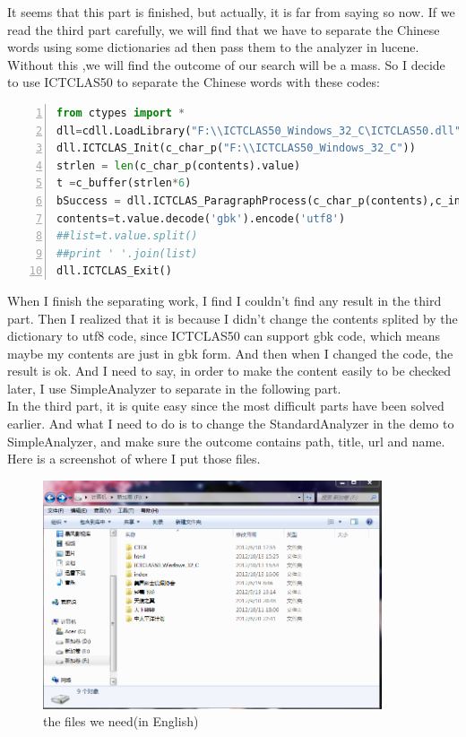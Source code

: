 \documentclass{article}
\begin{document}
It seems that this part is finished, but actually, it is far from saying so now. If we read the third part carefully, we will find that we have to separate the Chinese words using some dictionaries ad then pass them to the analyzer in lucene. Without this ,we will find the outcome of our search will be a mass. So I decide to use ICTCLAS50 to separate the Chinese words with these codes:\\
\begin{lstlisting}[language=python,numbers=left,frame=leftline]
from ctypes import *
dll=cdll.LoadLibrary("F:\\ICTCLAS50_Windows_32_C\ICTCLAS50.dll")
dll.ICTCLAS_Init(c_char_p("F:\\ICTCLAS50_Windows_32_C"))
strlen = len(c_char_p(contents).value)
t =c_buffer(strlen*6)
bSuccess = dll.ICTCLAS_ParagraphProcess(c_char_p(contents),c_int(strlen),t,c_int(0),0)
contents=t.value.decode('gbk').encode('utf8')
##list=t.value.split()
##print ' '.join(list)
dll.ICTCLAS_Exit()
\end{lstlisting}
When I finish the separating work, I find I couldn't find any result in the third part. Then I realized that it is because I didn't change the contents splited by the dictionary to utf8 code, since ICTCLAS50 can support gbk code, which means maybe my contents are just in gbk form. And then when I changed the code, the result is ok. And I need to say, in order to make the content easily to be checked later, I use SimpleAnalyzer to separate in the following part.\\
In the third part, it is quite easy since the most difficult parts have been solved earlier. And what I need to do is to change the StandardAnalyzer in the demo to SimpleAnalyzer, and make sure the outcome contains path, title, url and name.\\
Here is a screenshot of where I put those files.\\
\begin{figure}[htbp]
\centering
\includegraphics[width=10cm]{10.png}
\caption{the files we need(in English)}
\end{figure}
\end{document}
